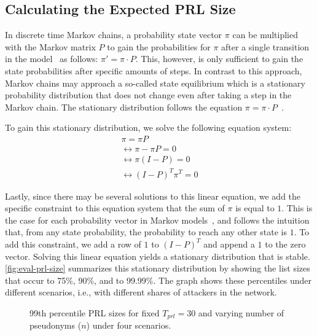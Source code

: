 \subsection{Calculating the Expected PRL Size}

In discrete time Markov chains, a probability state vector $\pi$ can be multiplied with the Markov matrix $P$ to gain the probabilities for $\pi$ after a single transition in the model~\cite{hermanns2002markov} as follows: $\pi' = \pi \cdot P$.
This, however, is only sufficient to gain the state probabilities after specific amounts of steps.
In contrast to this approach, Markov chains may approach a so-called state equilibrium which is a stationary probability distribution that does not change even after taking a step in the Markov chain.
The stationary distribution follows the equation $\pi = \pi \cdot P$~\cite{hermanns2002markov}.

To gain this stationary distribution, we solve the following equation system:
\begin{align*}
                &\pi = \pi P&\\
&\leftrightarrow \pi - \pi P = 0&\\
&\leftrightarrow \pi ( I - P ) = 0&\\
&\leftrightarrow ( I - P )^T \pi^T = 0&
\end{align*}

Lastly, since there may be several solutions to this linear equation, we add the
specific constraint to this equation system that the sum of $\pi$ is equal to
$1$. This is the case for each probability vector in Markov
models~\cite{hermanns2002markov}, and follows the intuition that, from any state
probability, the probability to reach any other state is $1$. To add this
constraint, we add a row of $1$ to $( I - P )^T$ and append a $1$ to the zero
vector. Solving this linear equation yields a stationary distribution that is
stable. \cref{fig:eval-prl-size} summarizes this stationary distribution by
showing the list sizes that occur to 75\%, 90\%, and to 99.99\%. The graph shows
these percentiles under different scenarios, i.e., with different shares of
attackers in the network.

\begin{figure}[t]
    \centering
    \resizebox{.83\linewidth}{!}{} 
    \caption[99th percentile PRL sizes for fixed $T_{prl}=30$ and varying $n$]{99th percentile PRL sizes for fixed $T_{prl}=30$ and varying number of pseudonyms ($n$) under four scenarios.}
    \label{fig:appendix:markov-n}   
\end{figure}

